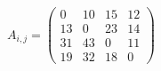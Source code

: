 \documentclass[12pt]{article}
\begin{document}
$ \begin{equation*}    A_{i,j} =     \begin{pmatrix}    0 & 10 & 15 & 12 \\    13 & 0 & 23 & 14 \\    31  & 43  & 0 & 11  \\    19 & 32 & 18 & 0     \end{pmatrix}    \end{equation*} $
\end{document}
